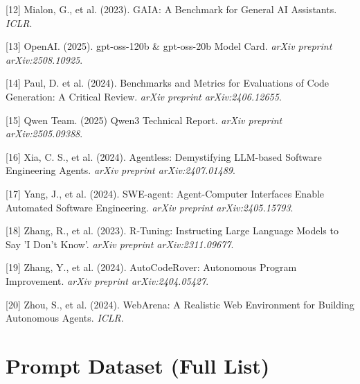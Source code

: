 \documentclass{article}
\begin{document}
[12] Mialon, G., et al. (2023). GAIA: A Benchmark for General AI Assistants. \textit{ICLR}.

[13] OpenAI. (2025). gpt-oss-120b \& gpt-oss-20b Model Card. \textit{arXiv preprint arXiv:2508.10925}.

[14] Paul, D. et al. (2024). Benchmarks and Metrics for Evaluations of Code Generation: A Critical Review. \textit{arXiv preprint arXiv:2406.12655}.

[15] Qwen Team. (2025) Qwen3 Technical Report. \textit{arXiv preprint arXiv:2505.09388}.

[16] Xia, C. S., et al. (2024). Agentless: Demystifying LLM-based Software Engineering Agents. \textit{arXiv preprint arXiv:2407.01489}.

[17] Yang, J., et al. (2024). SWE-agent: Agent-Computer Interfaces Enable Automated Software Engineering. \textit{arXiv preprint arXiv:2405.15793}.

[18] Zhang, R., et al. (2023). R-Tuning: Instructing Large Language Models to Say 'I Don't Know'. \textit{arXiv preprint arXiv:2311.09677}.

[19] Zhang, Y., et al. (2024). AutoCodeRover: Autonomous Program Improvement. \textit{arXiv preprint arXiv:2404.05427}.

[20] Zhou, S., et al. (2024). WebArena: A Realistic Web Environment for Building Autonomous Agents. \textit{ICLR}.


\appendix

\section{Prompt Dataset (Full List)}
\label{sec:prompt-dataset}
\end{document}
